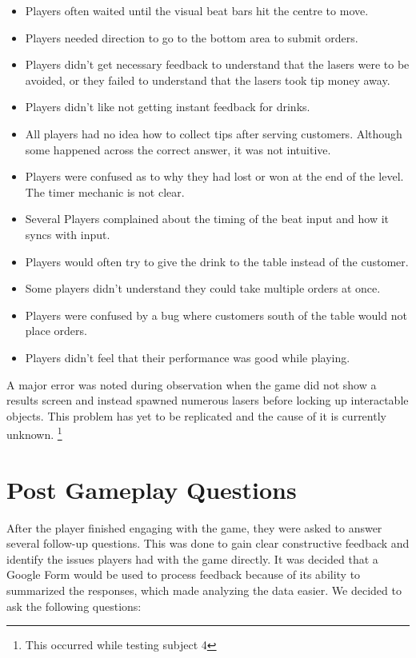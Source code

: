 \documentclass[twoside,twocolumn]{article}
\begin{document}
\begin{itemize}

    \item Players often waited until the visual beat bars hit the centre to move.
    \item Players needed direction to go to the bottom area to submit orders.
    \item Players didn't get necessary feedback to understand that the lasers were to be avoided, or they failed to understand that the lasers took tip money away.
    \item Players didn't like not getting instant feedback for drinks.
    \item All players had no idea how to collect tips after serving customers. Although some happened across the correct answer, it was not intuitive.
    \item Players were confused as to why they had lost or won at the end of the level. The timer mechanic is not clear.
    \item Several Players complained about the timing of the beat input and how it syncs with input.
    \item Players would often try to give the drink to the table instead of the customer.
    \item Some players didn't understand they could take multiple orders at once.
    \item Players were confused by a bug where customers south of the table would not place orders.
    \item Players didn't feel that their performance was good while playing.
\end{itemize}
A major error was noted during observation when the game did not
 show a results screen and instead spawned numerous
 lasers before locking up interactable objects. This problem has yet to 
be replicated and the cause of it is currently unknown. \footnote{This occurred while testing subject 4}




\section{Post Gameplay Questions}
After the player finished engaging with the
game, they were asked to answer several follow-up questions. This was done to gain clear constructive feedback and identify the issues players had with the game directly. 
It was decided that a Google Form would be used to process feedback because of its ability to summarized the responses, which made analyzing the data easier. We decided to ask the following questions:
\end{document}
